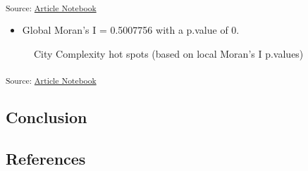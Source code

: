 \documentclass[
]{agujournal2019}
\providecommand{\tightlist}{%
  \setlength{\itemsep}{0pt}\setlength{\parskip}{0pt}}\usepackage{longtable,booktabs,array}
\begin{document}
\textsubscript{Source:
\href{https://aiti-flinders.github.io/sirp-complexity/index.qmd.html}{Article
Notebook}}

\begin{itemize}
\tightlist
\item
  Global Moran's I = 0.5007756 with a p.value of 0.
\end{itemize}

\label{cell-fig-complexity-hot-spots}
\begin{figure}[H]


\caption{\label{fig-complexity-hot-spots}City Complexity hot spots
(based on local Moran's I p.values)}

\end{figure}%

\textsubscript{Source:
\href{https://aiti-flinders.github.io/sirp-complexity/index.qmd.html}{Article
Notebook}}

\subsection{Conclusion}\label{conclusion}

\subsection*{References}\label{references}
\end{document}
